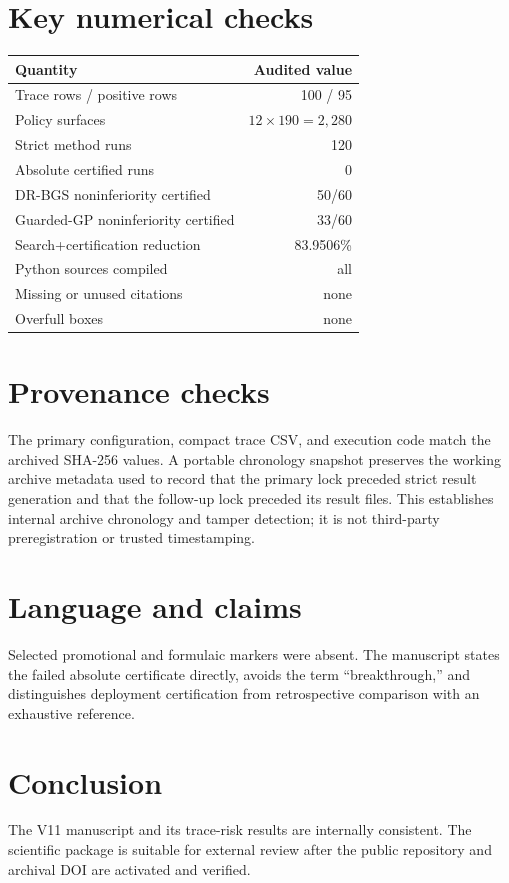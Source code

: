 \documentclass[11pt]{article}
\begin{document}
\section*{Key numerical checks}
\begin{tabular}{lr}
\toprule
Quantity & Audited value\\
\midrule
Trace rows / positive rows & 100 / 95\\
Policy surfaces & $12\times190=2{,}280$\\
Strict method runs & 120\\
Absolute certified runs & 0\\
DR-BGS noninferiority certified & 50/60\\
Guarded-GP noninferiority certified & 33/60\\
Search+certification reduction & 83.9506\%\\
Python sources compiled & all\\
Missing or unused citations & none\\
Overfull boxes & none\\
\bottomrule
\end{tabular}

\section*{Provenance checks}
The primary configuration, compact trace CSV, and execution code match the archived SHA-256 values. A portable chronology snapshot preserves the working archive metadata used to record that the primary lock preceded strict result generation and that the follow-up lock preceded its result files. This establishes internal archive chronology and tamper detection; it is not third-party preregistration or trusted timestamping.

\section*{Language and claims}
Selected promotional and formulaic markers were absent. The manuscript states the failed absolute certificate directly, avoids the term ``breakthrough,'' and distinguishes deployment certification from retrospective comparison with an exhaustive reference.

\section*{Conclusion}
The V11 manuscript and its trace-risk results are internally consistent. The scientific package is suitable for external review after the public repository and archival DOI are activated and verified.
\end{document}
